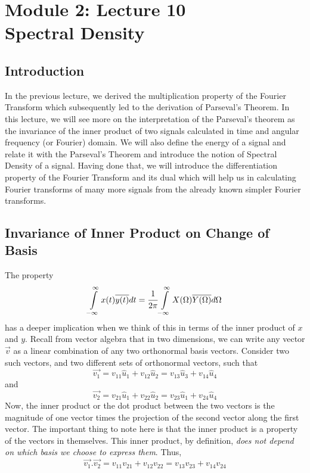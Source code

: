 \section{Module 2: Lecture 10\\Spectral Density}

\subsection{Introduction}
\noindent
In the previous lecture, we derived the multiplication property of the Fourier Transform which subsequently led to the derivation of Parseval’s Theorem. 
In this lecture, we will see more on the interpretation of the Parseval’s theorem as the invariance of the inner product of two signals calculated in time and angular frequency (or Fourier) domain. 
We will also define the energy of a signal and relate it with the Parseval’s Theorem and introduce the notion of Spectral Density of a signal.
Having done that, we will introduce the differentiation property of the Fourier Transform and its dual which will help us in calculating Fourier transforms of many more signals from the already known simpler Fourier transforms.
\subsection{Invariance of Inner Product on Change of Basis}
The property
\[
\int\limits_{-\infty}^{\infty}x(t)\overline{y(t)} dt = \cfrac{1}{2\pi}\int\limits_{-\infty}^{\infty}X(\Omega)\overline{Y(\Omega)} d\Omega
\]
has a deeper implication when we think of this in terms of the inner product of $x$ and $y$. Recall from vector algebra that in two dimensions, we can write any vector $\overrightarrow{v}$ as a linear combination of any two orthonormal basis vectors. Consider two such vectors, and two different sets of orthonormal vectors, such that
\[
\overrightarrow{v_1}=v_{11}\hat{u}_1+v_{12}\hat{u}_2 = v_{13}\hat{u}_3+v_{14}\hat{u}_4
\]
and
\[
\overrightarrow{v_2}=v_{21}\hat{u}_1+v_{22}\hat{u}_2 = v_{23}\hat{u}_1+v_{24}\hat{u}_4
\]
Now, the inner product or the dot product between the two vectors is the magnitude of one vector times the projection of the second vector along the first vector. The important thing to note here is that the inner product is a property of the vectors in themselves. This inner product, by definition, \emph{does not depend on which basis we choose to express them}. Thus,
\[
\overrightarrow{v_1}.\overrightarrow{v_2}=v_{11}v_{21}+v_{12}v_{22} = v_{13}v_{23}+v_{14}v_{24}
\]

